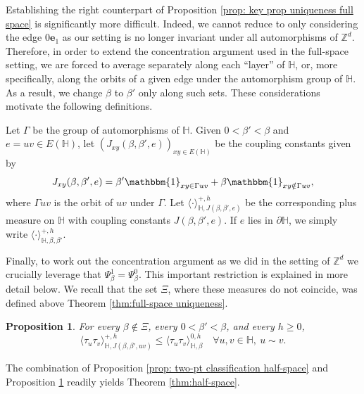 \documentclass[11pt,a4paper]{article}
\numberwithin{equation}{section}
\theoremstyle{plain}
\newtheorem{Prop}[Thm]{Proposition}
\theoremstyle{definition}
\begin{document}
Establishing the right counterpart of Proposition \ref{prop: key prop uniqueness full space} is significantly more difficult. Indeed, we cannot reduce to only considering the edge $0\mathbf e_1$ as our setting is no longer invariant under all automorphisms of $\mathbb Z^d$. Therefore, in order to extend the concentration argument used in the full-space setting, we are forced to average separately along each ``layer'' of $\mathbb H$, or, more specifically, along the orbits of a given edge under the automorphism group of $\mathbb H$. As a result, we change $\beta$ to $\beta'$ only along such sets. These considerations motivate the following definitions.  

Let $\Gamma$ be the group of automorphisms of $\mathbb{H}$. 
Given $0<\beta'<\beta$ and $e=uv\in E(\mathbb{H})$, let $(J_{xy}
(\beta,\beta',e))_{xy\in E(\mathbb H)}$ be the coupling constants given by
\begin{equation}
J_{xy}(\beta,\beta',e)=\beta'\mathbbm{1}_{xy\in \Gamma uv} + \beta\mathbbm{1}_{xy\notin \Gamma uv},
\end{equation}
where $\Gamma uv$ is the orbit of $uv$ under $\Gamma$. Let $\langle \cdot 
\rangle^{+,h}_{\mathbb{H},J(\beta,\beta',e)}$ be 
the corresponding plus measure on $\mathbb{H}$ with 
coupling constants $J(\beta,\beta',e)$. If $e$ lies in $\partial\mathbb{H}$, we simply write $\langle \cdot 
\rangle^{+,h}_{\mathbb{H},\beta,\beta'}$.

Finally, to work out the concentration argument as we did in the setting of $\mathbb Z^d$ we crucially leverage that $\Psi^1_\beta=\Psi^0_\beta$. This important restriction is explained in more detail below.  We recall that the set $\Xi$, where these measures do not coincide, was defined above Theorem \ref{thm:full-space uniqueness}. 


\begin{Prop}\label{prop: key prop uniqueness half space} For every $\beta \notin \Xi$, every $0<\beta'<\beta$, and every $h\geq 0$, 
\begin{equation}\label{eq:2 point ineq hs}
    \langle \tau_{u}\tau_v \rangle^{+,h}_{\mathbb{H},J(\beta,\beta',uv)}\leq \langle \tau_u \tau_v  \rangle^{0,h}_{\mathbb{H},\beta} \quad \forall u,v\in \mathbb H, \: u\sim v.
\end{equation}
\end{Prop}

The combination of Proposition \ref{prop: two-pt classification half-space} and Proposition \ref{prop: key prop uniqueness half space} readily yields Theorem \ref{thm:half-space}.
\end{document}
